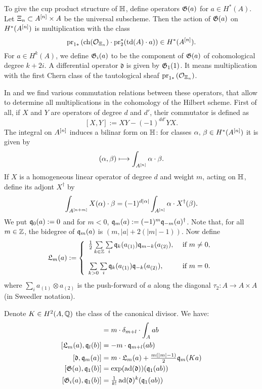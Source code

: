 \begin{definition}
To give the cup product structure of $\mathbb{H}$, define operators $\mathfrak{G}(a)$ for $a \in H^*(A)$. Let $\Xi_n \subset A^{[n]}\times A$ be the universal subscheme. Then the action of $\mathfrak{G}(a)$ on $H^*(A^{[n]})$ is multiplication with the class
$$
\operatorname{pr}_{1*}\left( \operatorname{ch}(\mathcal{O}_{\Xi_n})\cdot \operatorname{pr}_2^*(\operatorname{td}(A)\cdot a) \right) \in H^*(A^{[n]}).
$$
For $a \in H^k(A)$, we define $\mathfrak{G}_i(a)$ to be the component of $\mathfrak{G}(a)$ of cohomological degree $k+2i$. A differential operator $\mathfrak{d}$ is given by $\mathfrak{G}_1(1)$. It means multiplication with the first Chern class of the tautological sheaf $\operatorname{pr}_{1*}\left( \mathcal{O}_{\Xi_n}\right)$.
\end{definition}
In \cite{LehnSorger} and \cite{LiQinWang} we find various commutation relations between these operators, that allow to determine all multiplications in the cohomology of the Hilbert scheme. First of all, if $X$ and $Y$ are operators of degree $d$ and $d'$, their commutator is defined as 
$$
[X,Y] := XY - (-1)^{dd'}YX.
$$
The integral on $A^{[n]}$ induces a bilinar form on $\mathbb{H}$: for classes $\alpha,\,\beta\in H^*(A^{[n]})$ it is given by
$$
(\alpha,\beta) \longmapsto \int_{A^{[n]}}\alpha\cdot\beta.
$$
If $X$ is a homogeneous linear operator of degree $d$ and weight $m$, acting on $\mathbb{H}$, define its adjont $X^\dagger$ by
$$
\int_{A^{[n+m]}}X(\alpha)\cdot\beta = (-1)^{d|\alpha|}\int_{A^{[n]}} \alpha \cdot X^\dagger (\beta).
$$
We put $\mathfrak{q}_0(a) :=0$ and for $m<0$, $\mathfrak{q}_m(a) := (-1)^m \mathfrak{q}_{-m}(a)^\dagger$. Note that, for all $m\in\mathbb{Z}$, the bidegree of $\mathfrak{q}_m(a)$ is $(m,|a| + 2(|m|-1))$. Now define
$$
\mathfrak{L}_m(a) := \left\{ 
\begin{array}{ll}
 \tfrac{1}{2}\sum\limits_{k\in\Z}\sum\limits_{i}\q_k( a_{(1)})\q_{m-k}( a_{(2)}), & \text{ if } m\neq 0, \vspace{4mm}\\
 \sum\limits_{k>0}\sum\limits_{i}\q_k( a_{(1)})\q_{-k}( a_{(2)}), & \text{ if } m= 0. \\
\end{array}
\right.
$$
where $\sum_i a_{(1)}\otimes  a_{(2)}$ is the push-forward of $a$ along the diagonal $\tau_2 :A \rightarrow A\times A$ (in Sweedler notation).
\begin{lemma}\cite[Thm.~2.16]{LiQinWang} Denote $K\in H^2(A,\mathbb{Q})$ the class of the canonical divisor. We have:
\begin{align}
[\q_m(a), \q_l(b)] &= m\cdot \delta_{m+l} \cdot \int_A ab \\
[\mathfrak{L}_m(a),\q_l(b)] &= -m\cdot \q_{m+l}(ab) \\
\label{DiffNaka}
[\mathfrak{d},\q_m(a)] &= m \cdot \mathfrak{L}_m(a) + \tfrac{m(|m|-1)}{2} \q_m(K a) \\
[\G(a),\q_1(b)] &= \exp(\ad(\mathfrak{d}))(\q_1(a b) ) \\
[\G_i(a),\q_1(b)] &= \tfrac{1}{k!} \ad(\mathfrak{d})^k(\q_1(a b) ) 
\end{align}
\end{lemma}

